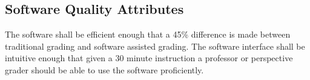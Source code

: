 \subsection{Software Quality Attributes}

The software shall be efficient enough that a 45\% difference is made between traditional grading and software assisted grading. The software interface shall be intuitive enough that given a 30 minute instruction a professor or perspective grader should be able to use the software proficiently. 

